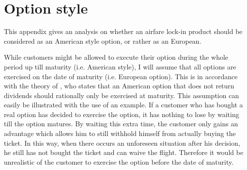 \appendix
\chapter{Option style}
\label{sec:OptionStyle}
This appendix gives an analysis on whether an airfare lock-in product should be considered as an American style option, or rather as an European.

While customers might be allowed to execute their option during the whole period up till maturity (i.e. American style), I will assume that all options are exercised on the date of maturity (i.e. European option). This is in accordance with the theory of , who states that an American option that does not return dividends should rationally only be exercised at maturity. This assumption can easily be illustrated with the use of an example. If a customer who has bought a real option has decided to exercise the option, it has nothing to lose by waiting till the option matures. By waiting this extra time, the customer only gains an advantage which allows him to still withhold himself from actually buying the ticket. In this way, when there occurs an unforeseen situation after his decision, he still has not bought the ticket and can waive the flight. Therefore it would be unrealistic of the customer to exercise the option before the date of maturity.


